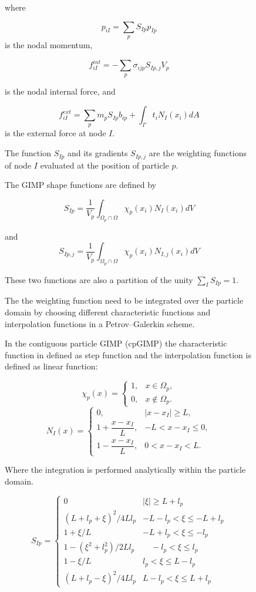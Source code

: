 \documentclass[11pt,a4paper]{article}
\begin{document}
\begin{figure}[h]
where 

$$p_{iI} = \sum_p S_{Ip} p_{Ip}  $$
is the nodal momentum, 

$$ f_{iI}^{int} = -\sum_p \sigma_{ijp} S_{Ip,j} V_p  $$

is the nodal internal force, and

$$ f_{iI}^{ext} = \sum_p m_p S_{Ip} b_{ip} + \int_{\Gamma} t_i N_I(x_i) dA  $$
is the external force at node  $I$.

The function $S_{Ip}$ and its gradients  $S_{Ip,j}$ are the weighting functions of node  $I$ evaluated at the position of particle $p$.

The GIMP shape functions are defined by 

$$ S_{Ip} =  \frac{1}{V_p} \int_{\Omega_p \cap \Omega} \chi_p(x_i) N_I(x_i) dV $$

and 
$$ S_{Ip,j} =  \frac{1}{V_p} \int_{\Omega_p \cap \Omega} \chi_p(x_i) N_{I,j}(x_i) dV $$ 

These two functions are also a partition of the unity $\sum_I S_{Ip} = 1 $.

The the weighting function need to be integrated over
the particle domain by choosing different characteristic functions and interpolation functions in a Petrov–Galerkin scheme.

In the contiguous particle GIMP (cpGIMP) the characteristic function in defined as step function and the interpolation function is defined as linear function:

$$ \chi_p(x) =
\begin{cases}
1, & x \in \Omega_p, \\
0, & x \notin \Omega_p.
\end{cases} $$
$$
N_I(x)=
\begin{cases}
0, & |x-x_I| \ge L, \\
1+\dfrac{x-x_I}{L}, & -L < x-x_I \le 0, \\
1-\dfrac{x-x_I}{L}, & 0 < x-x_I < L.
\end{cases}
$$

Where the integration is performed analytically within the particle domain.

$$ S_{I p}=\left\{\begin{array}{ll}0 & |\xi| \geq L+l_p 
\\ 
\left(L+l_p+\xi\right)^2 / 4 L l_p & -L-l_p<\xi \leq-L+l_p 
\\ 
1+\xi / L & -L+l_p<\xi \leq-l_p 
\\ 
1-\left(\xi^2+l_p^2\right) / 2 L l_p & \quad-l_p<\xi \leq l_p 
\\ 
1-\xi / L & l_p<\xi \leq L-l_p 
\\ 
\left(L+l_p-\xi\right)^2 / 4 L l_p & L-l_p<\xi \leq L+l_p\end{array}\right.
$$


\end{figure}
\end{document}
